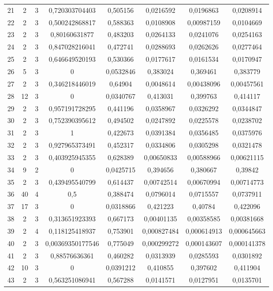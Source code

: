 \begin{longtable}{|c|c|c|c|c|c|c|c|}
21 & 2 & 3 & 0,720303704403 & 0,505156 & 0,0216592 & 0,0196863 & 0,0208914  \\
22 & 2 & 3 & 0,500242868817 & 0,588363 & 0,0108908 & 0,00987159 & 0,0104669  \\
23 & 2 & 3 & 0,80160631877 & 0,483203 & 0,0264133 & 0,0241076 & 0,0254163  \\
24 & 2 & 3 & 0,847028216041 & 0,472741 & 0,0288693 & 0,0262626 & 0,0277464  \\
25 & 2 & 3 & 0,646649520193 & 0,530366 & 0,0177617 & 0,0161534 & 0,0170947  \\
26 & 5 & 3 & 0 & 0,0532846 & 0,383024 & 0,369461 & 0,383779  \\
27 & 2 & 3 & 0,346218446019 & 0,64904 & 0,0048614 & 0,00438096 & 0,00457561  \\
28 & 12 & 3 & 0 & 0,0340767 & 0,413031 & 0,399763 & 0,414117  \\
29 & 2 & 3 & 0,957191728295 & 0,441196 & 0,0358967 & 0,0326292 & 0,0344847  \\
30 & 2 & 3 & 0,752390395612 & 0,494502 & 0,0247892 & 0,0225578 & 0,0238702  \\
31 & 2 & 3 & 1 & 0,422673 & 0,0391384 & 0,0356485 & 0,0375976  \\
32 & 2 & 3 & 0,927965373491 & 0,452317 & 0,0334806 & 0,0305298 & 0,0321478  \\
33 & 2 & 3 & 0,403925945355 & 0,628389 & 0,00650833 & 0,00588966 & 0,00621115  \\
34 & 9 & 2 & 0 & 0,0425715 & 0,394656 & 0,380667 & 0,39842  \\
35 & 2 & 3 & 0,439495540799 & 0,614437 & 0,00742514 & 0,00670994 & 0,00714773  \\
36 & 40 & 4 & 0,5 & 0,388474 & 0,0796014 & 0,0715557 & 0,0737911  \\
37 & 17 & 3 & 0 & 0,0318866 & 0,421223 & 0,40784 & 0,422096  \\
38 & 2 & 3 & 0,313651923393 & 0,667173 & 0,00401135 & 0,00358585 & 0,00381668  \\
39 & 2 & 4 & 0,118125418937 & 0,753901 & 0,000827484 & 0,000614913 & 0,000645663  \\
40 & 2 & 3 & 0,00369350177546 & 0,775049 & 0,000299272 & 0,000143607 & 0,000141378  \\
41 & 2 & 3 & 0,88576636361 & 0,460282 & 0,0313939 & 0,0285593 & 0,0301892  \\
42 & 10 & 3 & 0 & 0,0391212 & 0,410855 & 0,397602 & 0,411904  \\
43 & 2 & 3 & 0,563251086941 & 0,567288 & 0,0141571 & 0,0127951 & 0,0135701  \\

\end{longtable}

